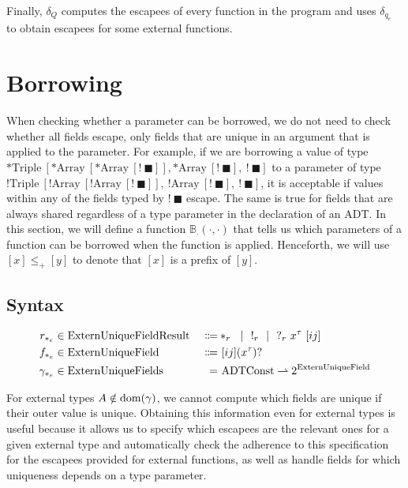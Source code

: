Finally, $\delta_Q$ computes the escapees of every function in the program and uses $\delta_{q_e}$ to obtain escapees for some external functions.

\newcommand{\Triple}{\mathrm{Triple}}
\newcommand{\Array}{\mathrm{Array}}
\section{Borrowing}\label{sec:borrowing}
When checking whether a parameter can be borrowed, we do not need to check whether all fields escape, only fields that are unique in an argument that is applied to the parameter. For example, if we are borrowing a value of type $*\Triple\ [*\Array\ [*\Array\ [!\ \blacksquare]], *\Array\ [!\ \blacksquare],\ !\ \blacksquare]$ to a parameter of type $!\Triple\ [!\Array\ [!\Array\ [!\ \blacksquare]],\ !\Array\ [!\ \blacksquare],\ !\ \blacksquare]$, it is acceptable if values within any of the fields typed by $!\ \blacksquare$ escape. The same is true for fields that are always shared regardless of a type parameter in the declaration of an ADT. In this section, we will define a function $\mathbb{B}_\cdot(\cdot, \cdot)$ that tells us which parameters of a function can be borrowed when the function is applied. Henceforth, we will use $[x] \leq_+ [y]$ to denote that $[x]$ is a prefix of $[y]$. 

\newcommand{\ExternUniqueFieldResult}{\mathrm{ExternUniqueFieldResult}}
\newcommand{\ExternUniqueField}{\mathrm{ExternUniqueField}}
\newcommand{\ExternUniqueFields}{\mathrm{ExternUniqueFields}}

\subsection{Syntax}
\begin{alignat*}{3}
	r_{*_e} &\in \ExternUniqueFieldResult\ &\Coloneqq& *_r \sep !_r \sep ?_r\ x^\tau\ [ij] \\
	f_{*_e} &\in \ExternUniqueField\ &\Coloneqq&\ [ij] (x^\tau)? \\
	\gamma_{*_e} &\in \ExternUniqueFields\ &=&\ \ADTConst \rightharpoonup 2^{\ExternUniqueField}
\end{alignat*}

For external types $A \notin \mathrm{dom}(\gamma)$, we cannot compute which fields are unique if their outer value is unique. Obtaining this information even for external types is useful because it allows us to specify which escapees are the relevant ones for a given external type and automatically check the adherence to this specification for the escapees provided for external functions, as well as handle fields for which uniqueness depends on a type parameter.

